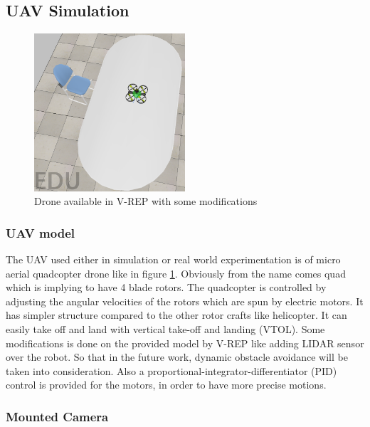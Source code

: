 \subsection{UAV Simulation}
\begin{figure}[H]

  \includegraphics[width=0.5\textwidth]{figures/Drone_VREP.png}
  \caption{Drone available in V-REP with some modifications}
  
  \label{fig:drone_vrep}  
\end{figure}


\subsubsection{UAV model}

The UAV used either in simulation or real world experimentation is of micro aerial quadcopter drone like in figure \ref{fig:drone_vrep}. Obviously from the name comes quad which is implying to have 4 blade rotors. The quadcopter is controlled by adjusting the angular velocities of the rotors which are spun by electric motors. It has simpler structure compared to the other rotor crafts like helicopter. It can easily take off and land with vertical take-off and landing (VTOL). Some modifications is done on the provided model by V-REP like adding LIDAR sensor over the robot. So that in the future work, dynamic obstacle avoidance will be taken into consideration. Also a proportional-integrator-differentiator (PID) control is provided for the motors, in order to have more precise motions.



\subsubsection{Mounted Camera}

